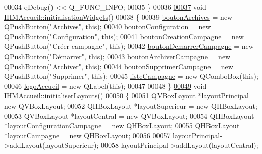 \begin{DoxyCode}
00034     qDebug() << Q\_FUNC\_INFO;
00035 \}
00036 
\hyperlink{class_i_h_m_accueil_a1385a94c1a3d75d813429dc9bdc4b050}{00037} \textcolor{keywordtype}{void} \hyperlink{class_i_h_m_accueil_a1385a94c1a3d75d813429dc9bdc4b050}{IHMAccueil::initialisationWidgets}()
00038 \{
00039     \hyperlink{class_i_h_m_accueil_a313a8c52763aa2978010db77ec6673ac}{boutonArchives} = \textcolor{keyword}{new} QPushButton(\textcolor{stringliteral}{"Archives"}, \textcolor{keyword}{this});
00040     \hyperlink{class_i_h_m_accueil_a8b8ed7d11ab66e3c6895b3c6129dc9c8}{boutonConfiguration} = \textcolor{keyword}{new} QPushButton(\textcolor{stringliteral}{"Configuration"}, \textcolor{keyword}{this});
00041     \hyperlink{class_i_h_m_accueil_a4186b4ef6a9c63f5b3c6431626ff3268}{boutonCreationCampagne} = \textcolor{keyword}{new} QPushButton(\textcolor{stringliteral}{"Créer campagne"}, \textcolor{keyword}{this});
00042     \hyperlink{class_i_h_m_accueil_a9fd8ab3abc0c1e6addd70c8d7c46fb65}{boutonDemarrerCampagne} = \textcolor{keyword}{new} QPushButton(\textcolor{stringliteral}{"Démarrer"}, \textcolor{keyword}{this});
00043     \hyperlink{class_i_h_m_accueil_a96d64cf254c0645eb45c317858b0a0f3}{boutonArchiverCampagne} = \textcolor{keyword}{new} QPushButton(\textcolor{stringliteral}{"Archiver"}, \textcolor{keyword}{this});
00044     \hyperlink{class_i_h_m_accueil_afb409fb4395372f35f9f8699fcb4c89b}{boutonSupprimerCampagne} = \textcolor{keyword}{new} QPushButton(\textcolor{stringliteral}{"Supprimer"}, \textcolor{keyword}{this});
00045     \hyperlink{class_i_h_m_accueil_afb828a4e06c25afa40341c310cd85b08}{listeCampagne} = \textcolor{keyword}{new} QComboBox(\textcolor{keyword}{this});
00046     \hyperlink{class_i_h_m_accueil_a709440124f3307589eee68c517833e6d}{logoAccueil} = \textcolor{keyword}{new} QLabel(\textcolor{keyword}{this});
00047 
00048 \}
\hyperlink{class_i_h_m_accueil_acaaa5d756165801403ea7d73ae40186b}{00049} \textcolor{keywordtype}{void} \hyperlink{class_i_h_m_accueil_acaaa5d756165801403ea7d73ae40186b}{IHMAccueil::initialiserLayouts}()
00050 \{
00051     QVBoxLayout *layoutPrincipal = \textcolor{keyword}{new} QVBoxLayout;
00052     QHBoxLayout *layoutSuperieur = \textcolor{keyword}{new} QHBoxLayout;
00053     QVBoxLayout *layoutCentral = \textcolor{keyword}{new} QVBoxLayout;
00054     QHBoxLayout *layoutConfigurationCampagne = \textcolor{keyword}{new} QHBoxLayout;
00055     QHBoxLayout *layoutCampagne = \textcolor{keyword}{new} QHBoxLayout;
00056 
00057     layoutPrincipal->addLayout(layoutSuperieur);
00058     layoutPrincipal->addLayout(layoutCentral);

\end{DoxyCode}
